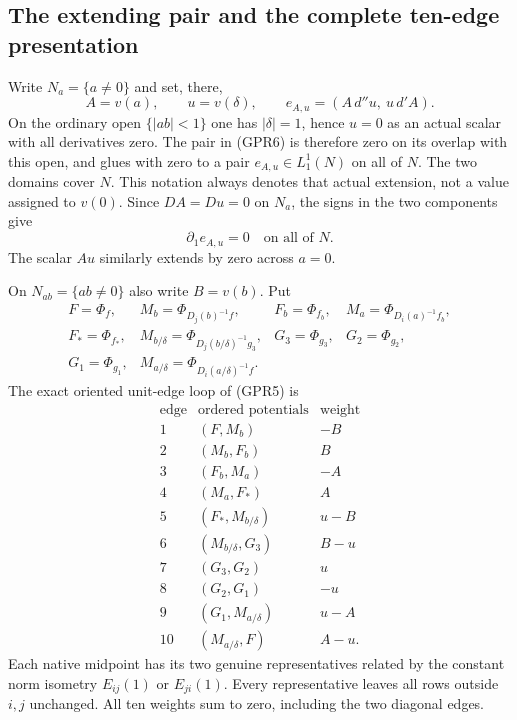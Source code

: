 \subsection{The extending pair and the complete ten-edge presentation}

Write $N_a=\{a\ne0\}$ and set, there,
\[
 A=v(a),\qquad u=v(\delta),\qquad
 e_{A,u}=(A\,d''u,\ u\,d'A).
 \tag{GPR6}
\]
On the ordinary open $\{|ab|<1\}$ one has $|\delta|=1$, hence
$u=0$ as an actual scalar with all derivatives zero.  The pair in
(GPR6) is therefore zero on its overlap with this open, and glues
with zero to a pair $e_{A,u}\in L_1^1(N)$ on all of $N$.
The two domains cover $N$.  This notation always denotes that
actual extension, not a value assigned to $v(0)$.
Since $DA=Du=0$ on $N_a$, the signs in the two components give
\[
                         \partial_1e_{A,u}=0
                                      \quad\text{on all of }N.
 \tag{GPR7}
\]
The scalar $Au$ similarly extends by zero across $a=0$.

On $N_{ab}=\{ab\ne0\}$ also write $B=v(b)$.  Put
\[
\begin{array}{llll}
 F=\Phi_f,& M_b=\Phi_{D_j(b)^{-1}f},& F_b=\Phi_{f_b},
   & M_a=\Phi_{D_i(a)^{-1}f_b},\\
 F_*=\Phi_{f_*},& M_{b/\delta}=\Phi_{D_j(b/\delta)^{-1}g_3},
 &G_3=\Phi_{g_3},&G_2=\Phi_{g_2},\\
 G_1=\Phi_{g_1},&M_{a/\delta}=\Phi_{D_i(a/\delta)^{-1}f}.&&
\end{array}
\tag{GPR8}
\]
The exact oriented unit-edge loop of (GPR5) is
\[
\begin{array}{c|c|c}
\text{edge}&\text{ordered potentials}&\text{weight}\\\hline
1&(F,M_b)&-B\\
2&(M_b,F_b)&B\\
3&(F_b,M_a)&-A\\
4&(M_a,F_*)&A\\
5&(F_*,M_{b/\delta})&u-B\\
6&(M_{b/\delta},G_3)&B-u\\
7&(G_3,G_2)&u\\
8&(G_2,G_1)&-u\\
9&(G_1,M_{a/\delta})&u-A\\
10&(M_{a/\delta},F)&A-u.
\end{array}
\tag{GPR9}
\]
Each native midpoint has its two genuine representatives related
by the constant norm isometry $E_{ij}(1)$ or $E_{ji}(1)$.
Every representative leaves all rows outside $i,j$ unchanged.
All ten weights sum to zero, including the two diagonal edges.

